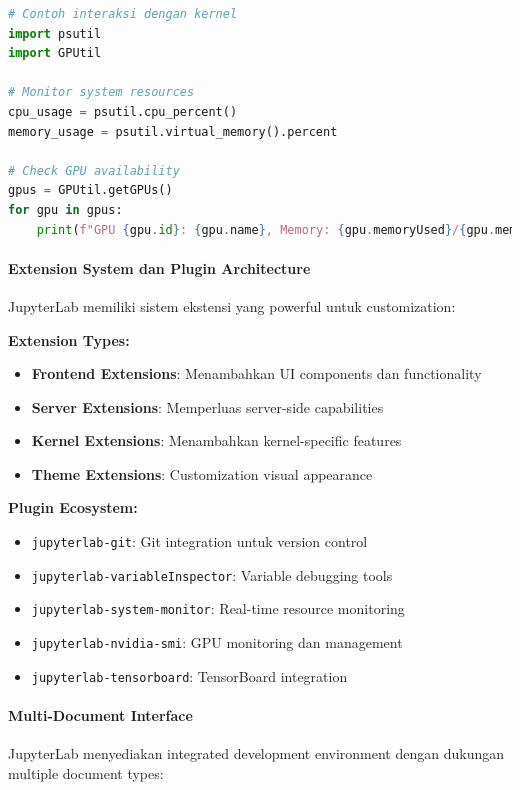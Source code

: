 \begin{lstlisting}[language=Python]
# Contoh interaksi dengan kernel
import psutil
import GPUtil

# Monitor system resources
cpu_usage = psutil.cpu_percent()
memory_usage = psutil.virtual_memory().percent

# Check GPU availability
gpus = GPUtil.getGPUs()
for gpu in gpus:
    print(f"GPU {gpu.id}: {gpu.name}, Memory: {gpu.memoryUsed}/{gpu.memoryTotal}MB")
\end{lstlisting}

\paragraph{Extension System dan Plugin Architecture}

JupyterLab memiliki sistem ekstensi yang powerful untuk customization:

\textbf{Extension Types:}
\begin{itemize}
\item \textbf{Frontend Extensions}: Menambahkan UI components dan functionality
\item \textbf{Server Extensions}: Memperluas server-side capabilities
\item \textbf{Kernel Extensions}: Menambahkan kernel-specific features
\item \textbf{Theme Extensions}: Customization visual appearance
\end{itemize}

\textbf{Plugin Ecosystem:}
\begin{itemize}
\item \texttt{jupyterlab-git}: Git integration untuk version control
\item \texttt{jupyterlab-variableInspector}: Variable debugging tools
\item \texttt{jupyterlab-system-monitor}: Real-time resource monitoring
\item \texttt{jupyterlab-nvidia-smi}: GPU monitoring dan management
\item \texttt{jupyterlab-tensorboard}: TensorBoard integration
\end{itemize}

\paragraph{Multi-Document Interface}

JupyterLab menyediakan integrated development environment dengan dukungan multiple document types:


